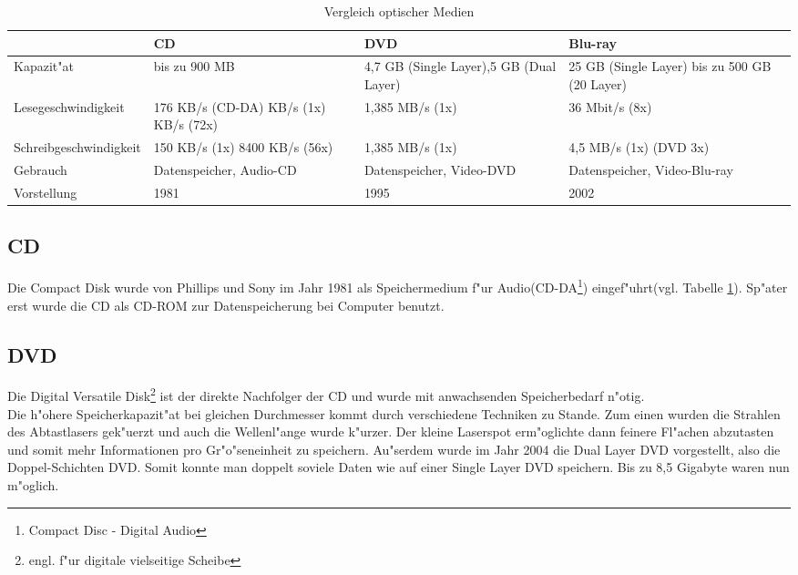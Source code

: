         
{%
\label{ch:Technisch:sec:Optische SpeicherungM}     
\begin{table}[ht]
\small
\begin{tabular}{|p{3.8cm}|p{3.2cm}|p{3cm}|p{3cm}|}
\hline
~ & CD & DVD & Blu-ray \\ \hline
Kapazit"at & bis zu 900 MB & 4,7 GB (Single Layer)\newline 8,5 GB (Dual Layer)  & 25 GB (Single Layer) bis zu 500 GB (20 Layer) \\  \hline
Lesegeschwindigkeit & 176 KB/s (CD-DA)\newline 150 KB/s (1x) \newline 10800 KB/s (72x) & 1,385 MB/s (1x) & 36 Mbit/s (8x) \\ \hline
Schreibgeschwindigkeit & 150 KB/s (1x)  8400 KB/s (56x) & 1,385 MB/s (1x) & 4,5 MB/s (1x) (DVD 3x) \\ \hline
Gebrauch & Datenspeicher, Audio-CD & Datenspeicher, Video-DVD & Datenspeicher, Video-Blu-ray \\ \hline
Vorstellung & 1981 & 1995 & 2002 \\
\hline
\end{tabular}
\caption{Vergleich optischer Medien}
\label{tab:vlgOptMed}
\end{table}
}%


        \subsection{CD}
        \label{ch:Technisch:sec:Optische Speicherung:sub:CD}
        
            Die Compact Disk wurde von Phillips und Sony im Jahr 1981 als Speichermedium f"ur Audio(CD-DA\footnote[9]{Compact Disc - Digital Audio}) eingef"uhrt(vgl. Tabelle \ref{tab:vlgOptMed}). Sp"ater erst wurde die CD als CD-ROM zur Datenspeicherung bei Computer benutzt. 
        
        \subsection{DVD}
        \label{ch:Technisch:sec:Optische Speicherung:sub:DVD}
        
            Die Digital Versatile Disk\footnote[10]{engl. f"ur digitale vielseitige Scheibe} ist der direkte Nachfolger der CD und wurde mit anwachsenden Speicherbedarf n"otig. 
            \\
            Die h"ohere Speicherkapazit"at bei gleichen Durchmesser kommt durch verschiedene Techniken zu Stande. Zum einen wurden die Strahlen des Abtastlasers gek"uerzt und auch die Wellenl"ange wurde k"urzer. Der kleine Laserspot erm"oglichte dann feinere Fl"achen abzutasten und somit mehr Informationen pro Gr"o"seneinheit zu speichern. Au"serdem wurde im Jahr 2004 die Dual Layer DVD vorgestellt, also die \glqq Doppel-Schichten DVD\grqq{}. Somit konnte man doppelt soviele Daten wie auf einer Single Layer DVD speichern. Bis zu 8,5 Gigabyte waren nun m"oglich.
        
